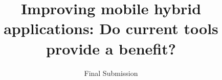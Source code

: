 \documentclass{acm_proc_article-sp}
\begin{document}
\title{Improving mobile hybrid applications: Do current tools provide a benefit?}
\subtitle{Final Submission}
%
%
%
%
%
\end{document}
